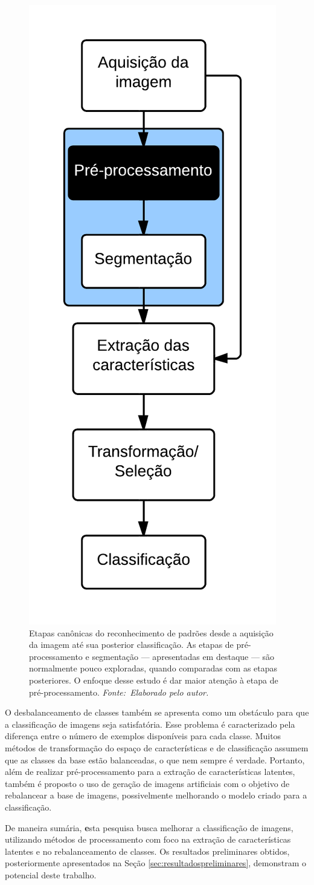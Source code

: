 \begin{figure}[!ht]
 \begin{center}
   \includegraphics[width=0.3\linewidth]{figuras/flow.png}
 \end{center}
 \caption[Etapas canônicas do reconhecimento de padrões desde a aquisição da imagem até sua posterior classificação.]{Etapas canônicas do reconhecimento de padrões desde a aquisição da imagem até sua posterior classificação. As etapas de pré-processamento e segmentação --- apresentadas em destaque --- são normalmente pouco exploradas, quando comparadas com as etapas posteriores. O enfoque desse estudo é dar maior atenção à etapa de pré-processamento. \textit{Fonte:~Elaborado pelo autor.}}
 \label{fig:fluxo}
\end{figure}

\enlargethispage{-\baselineskip}

O desbalanceamento de classes também se apresenta como um obstáculo para que a classificação de imagens seja satisfatória. Esse problema é caracterizado pela diferença entre o número de exemplos disponíveis para cada classe. Muitos métodos de transformação do espaço de características e de classificação assumem que as classes da base estão balanceadas, o que nem sempre é verdade. Portanto, além de realizar pré\hyp{}processamento para a extração de características latentes, também é proposto o uso de geração de imagens artificiais com o objetivo de rebalancear a base de imagens, possivelmente melhorando o modelo criado para a classificação.

De maneira sumária, {\textbf esta pesquisa busca melhorar a classificação de imagens, utilizando métodos de processamento com foco na extração de características latentes e no rebalanceamento de classes.} Os resultados preliminares obtidos, posteriormente apresentados na Seção \ref{sec:resultadospreliminares}, demonstram o potencial deste trabalho.

